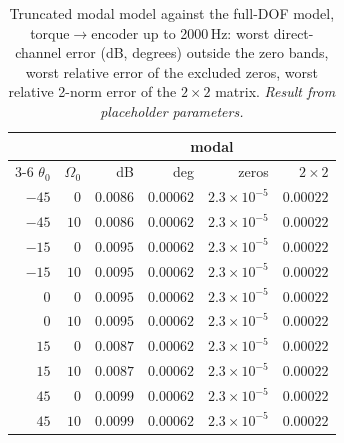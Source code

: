 \documentclass[10pt,a4paper]{article}
\numberwithin{equation}{section}
\begin{document}
\begin{table}[H]\centering\small\setlength{\tabcolsep}{4pt}
\caption{Truncated modal model against the full-DOF model, torque$\to$encoder up to 2000\,Hz: worst direct-channel error (dB, degrees) outside the zero bands, worst relative error of the excluded zeros, worst relative 2-norm error of the $2\times2$ matrix. \emph{Result from placeholder parameters.}}\label{tab:modal_vs_full}
\begin{tabular}{rrrrrr}\toprule
& & \multicolumn{4}{c}{modal} \\ \cmidrule(lr){3-6}
$\theta_0$ & $\Omega_0$ & dB & deg & zeros & $2\times2$ \\ \midrule
$-45$ & $0$ & $0.0086$ & $0.00062$ & $2.3\times10^{-5}$ & $0.00022$ \\
$-45$ & $10$ & $0.0086$ & $0.00062$ & $2.3\times10^{-5}$ & $0.00022$ \\
$-15$ & $0$ & $0.0095$ & $0.00062$ & $2.3\times10^{-5}$ & $0.00022$ \\
$-15$ & $10$ & $0.0095$ & $0.00062$ & $2.3\times10^{-5}$ & $0.00022$ \\
$0$ & $0$ & $0.0095$ & $0.00062$ & $2.3\times10^{-5}$ & $0.00022$ \\
$0$ & $10$ & $0.0095$ & $0.00062$ & $2.3\times10^{-5}$ & $0.00022$ \\
$15$ & $0$ & $0.0087$ & $0.00062$ & $2.3\times10^{-5}$ & $0.00022$ \\
$15$ & $10$ & $0.0087$ & $0.00062$ & $2.3\times10^{-5}$ & $0.00022$ \\
$45$ & $0$ & $0.0099$ & $0.00062$ & $2.3\times10^{-5}$ & $0.00022$ \\
$45$ & $10$ & $0.0099$ & $0.00062$ & $2.3\times10^{-5}$ & $0.00022$ \\
\bottomrule\end{tabular}\end{table}
\end{document}
